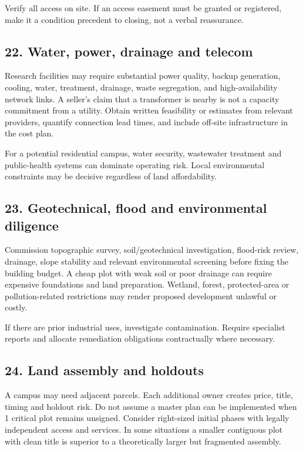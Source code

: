 Verify all access on site. If an access easement must be granted or registered, make it a condition precedent to closing, not a verbal reassurance.


\subsection{22. Water, power, drainage and telecom}

Research facilities may require substantial power quality, backup generation, cooling, water, treatment, drainage, waste segregation, and high-availability network links. A seller's claim that a transformer is nearby is not a capacity commitment from a utility. Obtain written feasibility or estimates from relevant providers, quantify connection lead times, and include off-site infrastructure in the cost plan.

For a potential residential campus, water security, wastewater treatment and public-health systems can dominate operating risk. Local environmental constraints may be decisive regardless of land affordability.


\subsection{23. Geotechnical, flood and environmental diligence}

Commission topographic survey, soil/geotechnical investigation, flood-risk review, drainage, slope stability and relevant environmental screening before fixing the building budget. A cheap plot with weak soil or poor drainage can require expensive foundations and land preparation. Wetland, forest, protected-area or pollution-related restrictions may render proposed development unlawful or costly.

If there are prior industrial uses, investigate contamination. Require specialist reports and allocate remediation obligations contractually where necessary.


\subsection{24. Land assembly and holdouts}

A campus may need adjacent parcels. Each additional owner creates price, title, timing and holdout risk. Do not assume a master plan can be implemented when 1 critical plot remains unsigned. Consider right-sized initial phases with legally independent access and services. In some situations a smaller contiguous plot with clean title is superior to a theoretically larger but fragmented assembly.

